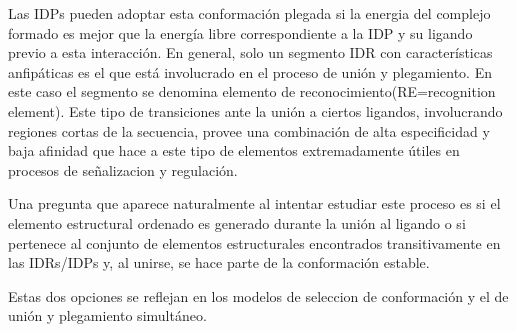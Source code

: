 Las IDPs pueden adoptar esta conformación plegada si la energia del complejo formado es mejor que la energía libre correspondiente a la IDP y su ligando previo a esta interacción.
En general, solo un segmento IDR con características anfipáticas es el que está involucrado en el proceso de unión y plegamiento. En este caso el segmento se denomina elemento de reconocimiento(RE=recognition element). 
Este tipo de transiciones ante la unión a ciertos ligandos, involucrando regiones cortas de la secuencia, provee una combinación de alta especificidad y baja afinidad que hace a este tipo de elementos extremadamente útiles en procesos de señalizacion y regulación.

Una pregunta que aparece naturalmente al intentar estudiar este proceso es si el elemento estructural ordenado es generado durante la unión al ligando 
o si pertenece al conjunto de elementos estructurales encontrados transitivamente en las IDRs/IDPs y, al unirse, se hace parte de la conformación estable.

Estas dos opciones se reflejan en los modelos de seleccion de conformación y el de unión y plegamiento simultáneo.

